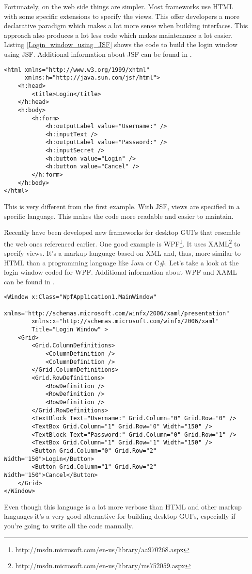 Fortunately, on the web side things are simpler. Most frameworks use HTML with some specific extensions to specify the views. This offer developers a more declarative paradigm which makes a lot more sense when building interfaces. This approach also produces a lot less code which makes maintenance a lot easier. Listing \ref{Login_window_using_JSF} shows the code to build the login window using JSF. Additional information about JSF can be found in \cite{Mastering_JavaServer_Faces}.
\lstset{language=HTML}
\begin{lstlisting}[caption={Login window using JSF}, label=Login_window_using_JSF]
<html xmlns="http://www.w3.org/1999/xhtml"
      xmlns:h="http://java.sun.com/jsf/html">
    <h:head>
        <title>Login</title>
    </h:head>
    <h:body>
        <h:form>
            <h:outputLabel value="Username:" />
            <h:inputText />
            <h:outputLabel value="Password:" />
            <h:inputSecret />
            <h:button value="Login" />
            <h:button value="Cancel" />
        </h:form>
    </h:body>
</html>
\end{lstlisting}
This is very different from the first example. With JSF, views are specified in a specific language. This makes the code more readable and easier to maintain.

Recently have been developed new frameworks for desktop GUI's that resemble the web ones referenced earlier. One good example is WPF\footnote{http://msdn.microsoft.com/en-us/library/aa970268.aspx}. It uses XAML\footnote{http://msdn.microsoft.com/en-us/library/ms752059.aspx} to specify views. It's a markup language based on XML and, thus, more similar to HTML than a programming language like Java or C\#. Let's take a look at the login window coded for WPF. Additional information about WPF and XAML can be found in \cite{WPF_in_Action_with_Visual_Studio_2008}.
\lstset{language=XML}
\begin{lstlisting}[caption={Login window using WPF}]
<Window x:Class="WpfApplication1.MainWindow"
        xmlns="http://schemas.microsoft.com/winfx/2006/xaml/presentation"
        xmlns:x="http://schemas.microsoft.com/winfx/2006/xaml"
        Title="Login Window" >
    <Grid>
        <Grid.ColumnDefinitions>
            <ColumnDefinition />
            <ColumnDefinition />
        </Grid.ColumnDefinitions>
        <Grid.RowDefinitions>
            <RowDefinition />
            <RowDefinition />
            <RowDefinition />
        </Grid.RowDefinitions>
        <TextBlock Text="Username:" Grid.Column="0" Grid.Row="0" />
        <TextBox Grid.Column="1" Grid.Row="0" Width="150" />
        <TextBlock Text="Password:" Grid.Column="0" Grid.Row="1" />
        <TextBox Grid.Column="1" Grid.Row="1" Width="150" />
        <Button Grid.Column="0" Grid.Row="2" Width="150">Login</Button>
        <Button Grid.Column="1" Grid.Row="2" Width="150">Cancel</Button>
    </Grid>
</Window>
\end{lstlisting}
Even though this language is a lot more verbose than HTML and other markup languages it's a very good alternative for building desktop GUI's, especially if you're going to write all the code manually.

